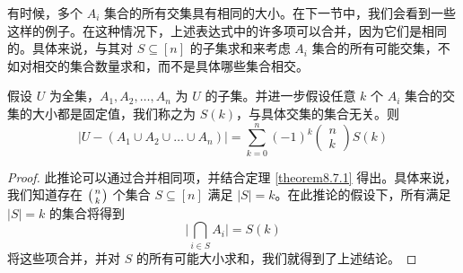 有时候，多个 $A_i$ 集合的所有交集具有相同的大小。在下一节中，我们会看到一些这样的例子。在这种情况下，上述表达式中的许多项可以合并，因为它们是相同的。具体来说，与其对 $S \subseteq [n]$ 的子集求和来考虑 $A_i$ 集合的所有可能交集，不如对相交的集合数量求和，而不是具体哪些集合相交。

\newpage

\begin{corollary}
    假设 $U$ 为全集，$A_1, A_2, \dots , A_n$ 为 $U$ 的子集。并进一步假设任意 $k$ 个 $A_i$ 集合的交集的大小都是固定值，我们称之为 $S(k)$，与具体交集的集合无关。则
    \[|U - (A_1 \cup A_2 \cup \dots \cup A_n)| = \sum_{k=0}^{n}(-1)^k \begin{pmatrix}n\\k\end{pmatrix}S(k)\]
\end{corollary}

\begin{proof}
    此推论可以通过合并相同项，并结合定理 \ref{theorem8.7.1} 得出。具体来说，我们知道存在 $\big({n \atop k}\big)$ 个集合 $S \subseteq [n]$ 满足 $|S| = k$。在此推论的假设下，所有满足 $|S| = k$ 的集合将得到
    \[\bigg|\bigcap_{i \in S} A_i\bigg|=S(k)\]
    将这些项合并，并对 $S$ 的所有可能大小求和，我们就得到了上述结论。
\end{proof}